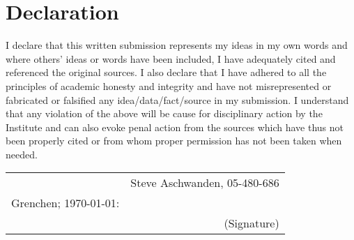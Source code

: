 \chapter*{Declaration}
\thispagestyle{empty}

\vspace{0.2in}
I declare that this written submission represents my ideas in my own words and where others' ideas or words have been included, I have adequately cited and referenced the original sources. I also declare that I have adhered to all the principles of academic honesty and integrity and have not misrepresented or fabricated or falsified any \mbox{idea/data/fact/source} in my submission. I understand that any violation of the above will be cause for disciplinary action by the Institute and can also evoke penal action from the sources which have thus not been properly cited or from whom proper permission has not been taken when needed.
\vspace{1in}
\begin{center}
\begin{tabular*}{\textwidth}{@{\extracolsep{\fill}} lr }
\vspace{0.5in}
& Steve Aschwanden, 05-480-686\\
Grenchen; \today: & \hrulefill \\
& (Signature)\\
\end{tabular*}
\end{center}
